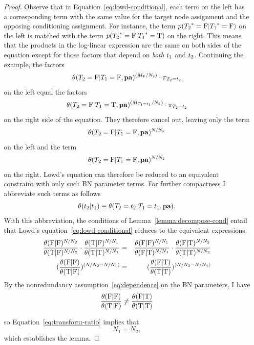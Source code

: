 \documentclass{sfuthesis}
\begin{document}
\begin{appendices}
\begin{proof}
Observe that in Equation~\eqref{eq:lowd-conditional}, each term on the left has a corresponding term with the same value for the target node assignment and the opposing conditioning assignment. For instance, the term $p({T_{2}}^{*}\hspace{0.0ex}=\mathrm{F}|{T_{1}}^{*}\hspace{0.0ex}=\mathrm{F})$ on the left is matched with the term $p({T_{2}}^{*}\hspace{0.0ex}=\mathrm{F}|{T_{1}}^{*}\hspace{0.0ex}=\mathrm{T})$ on the right. This means that the products in the log-linear expression are the same on both sides of the equation except for those factors that depend on {\em both} $t_{1}$ and $t_{2}$. Continuing the example, the factors $$\theta(T_{2} = \mathrm{F}|T_{1} = \mathrm{F},\mathbf{pa})^{(M_{\mathrm{F}}/N_{2})} \cdot \pi_{T_2=t_{2}}$$ on the left equal the factors $$\theta(T_{2} = \mathrm{F}|T_{1} = \mathrm{T},\mathbf{pa})^{(M_{T_1=t_{1}}/N_{2})}\cdot \pi_{T_2=t_{2}}$$ on the right side of the equation. They therefore cancel out, leaving only the term $$\theta(T_{2} = \mathrm{F}|T_{1} = \mathrm{F},\mathbf{pa})^{N/N_{2}}$$ on the left and the term $$\theta(T_{2} = \mathrm{F}|T_{1} = \mathrm{F},\mathbf{pa})^{N/N_{2}}$$ on the right. Lowd's equation can therefore be reduced to an equivalent constraint with only such BN parameter terms. For further compactness I  abbreviate such terms as follows
%
$$\theta(t_{2}|t_{1}) \equiv \theta(T_{2} = t_{2}|T_{1} = t_{1},\mathbf{pa}).$$ With this abbreviation, the conditions of Lemma~\ref{lemma:decompose-cond} entail that Lowd's equation~\ref{eq:lowd-conditional} reduces to the equivalent expressions.
%
\begin{eqnarray}
\frac{\theta(\mathrm{F}|\mathrm{F})^{N/N_{2}}}{\theta(\mathrm{T}|\mathrm{F})^{N/N_{2}} }  \cdot \frac{\theta(\mathrm{T}|\mathrm{F})^{N/N_{1}} }{\theta(\mathrm{T}|\mathrm{T})^{N/N_{1}} }  & = & \frac{\theta(\mathrm{F}|\mathrm{F})^{N/N_{1}} }{\theta(\mathrm{F}|\mathrm{T})^{N/N_{1}} }  \cdot \frac{\theta(\mathrm{F}|\mathrm{T})^{N/N_{2}} }{\theta(\mathrm{T}|\mathrm{T})^{N/N_{2}} } \\
(\frac{\theta(\mathrm{F}|\mathrm{F})}{\theta(\mathrm{T}|\mathrm{F}) })^{\left(N/N_{2}-N/N_{1}\right)}   & = &  (\frac{\theta(\mathrm{F}|\mathrm{T}) }{\theta(\mathrm{T}|\mathrm{T})})^{\left(N/N_{2}-N/N_{1}\right)} \label{eq:transform-ratio}
\end{eqnarray}
By the nonredundancy  assumption~\eqref{eq:dependence} on the BN parameters, I  have
%
$$\frac{\theta(\mathrm{F}|\mathrm{F})}{\theta(\mathrm{T}|\mathrm{F}) }   \neq  \frac{\theta(\mathrm{F}|\mathrm{T}) }{\theta(\mathrm{T}|\mathrm{T})}$$

so Equation~\ref{eq:transform-ratio} implies that 
%
$$N_{1} = N_{2}, $$ which establishes the lemma. 
\end{proof}


\end{appendices}
\end{document}
